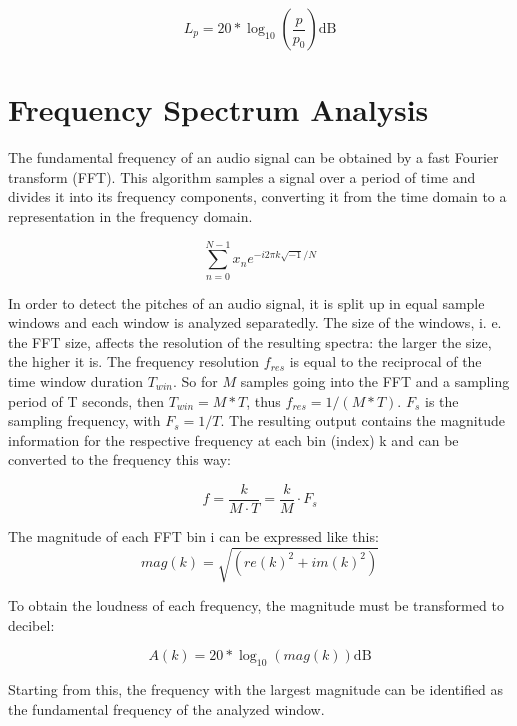 \documentclass[runningheads,a4paper]{llncs}
\begin{document}
\begin{equation}
L_p = 20 * \log_{10}(\frac{p}{p_0}) \mathrm{dB}
\label{eq:spl}
\end{equation}

\section{Frequency Spectrum Analysis}
\label{sec:fft}
The fundamental frequency of an audio signal can be obtained by a fast Fourier transform (FFT). This algorithm samples a signal over a period of time and divides it into its frequency components, converting it from the time domain to a representation in the frequency domain.

\begin{equation}
\sum_{n=0}^{N-1}x_n  e^{-i 2 \pi k\sqrt{-1}/N}
\label{eq:fft}
\end{equation}

In order to detect the pitches of an audio signal, it is split up in equal sample windows and each window is analyzed separatedly. The size of the windows, i. e. the FFT size, affects the resolution of the resulting spectra: the larger the size, the higher it is. The frequency resolution $f_{res}$  is equal to the reciprocal of the time window duration $T_{win}$. So for $M$ samples going into the FFT and a sampling period of T seconds, then $T_{win} = M*T$, thus $f_{res} = 1/(M*T)$. $F_s$ is the sampling frequency, with $F_s = 1/T$.
The resulting output contains the magnitude information for the respective frequency at each bin (index) k and can be converted to the frequency this way:

\begin{equation}
f = \frac{k}{M \cdot T} = \frac{k}{M} \cdot {F_s}
\label{eq:fft}
\end{equation}

The magnitude of each FFT bin i can be expressed like this:
\begin{equation}
mag(k) = \sqrt{(re(k)^{2} + im(k)^{2})}
\label{eq:mag}
\end{equation}

To obtain the loudness of each frequency, the magnitude must be transformed to decibel:

\begin{equation}
A(k) = 20 * \log_{10}( mag(k) ) \mathrm{dB}
\label{eq:loc}
\end{equation}

Starting from this, the frequency with the largest magnitude can be identified as the fundamental frequency of the analyzed window.
\end{document}
